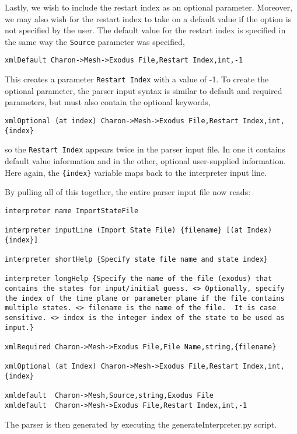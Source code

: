 Lastly, we wish to include the restart index as an optional parameter.
Moreover, we may also wish for the restart index to take on a default
value if the option is not specified by the user.  The default value
for the restart index is specified in the same way the \texttt{Source}
parameter was specified,
\begin{lstlisting}
xmlDefault Charon->Mesh->Exodus File,Restart Index,int,-1
\end{lstlisting}
This creates a parameter \texttt{Restart Index} with a value of -1.
To create the optional parameter, the parser input syntax is similar
to default and required parameters, but must also contain the optional
keywords,
\begin{lstlisting}
xmlOptional (at index) Charon->Mesh->Exodus File,Restart Index,int,{index}
\end{lstlisting}
so the \texttt{Restart Index} appears twice in the parser input file.
In one it contains default value information and in the other,
optional user-supplied information.  Here again, the
\texttt{\{index\}} variable maps back to the interpreter input line.

By pulling all of this together, the entire parser input file now reads:
\begin{lstlisting}
interpreter name ImportStateFile

interpreter inputLine (Import State File) {filename} [(at Index) {index}]

interpreter shortHelp {Specify state file name and state index}

interpreter longHelp {Specify the name of the file (exodus) that contains the states for input/initial guess. <> Optionally, specify the index of the time plane or parameter plane if the file contains multiple states. <> filename is the name of the file.  It is case sensitive. <> index is the integer index of the state to be used as input.}

xmlRequired Charon->Mesh->Exodus File,File Name,string,{filename} 

xmlOptional (at Index) Charon->Mesh->Exodus File,Restart Index,int,{index}

xmldefault  Charon->Mesh,Source,string,Exodus File
xmldefault  Charon->Mesh->Exodus File,Restart Index,int,-1
\end{lstlisting}
The parser is then generated by executing the generateInterpreter.py
script.

